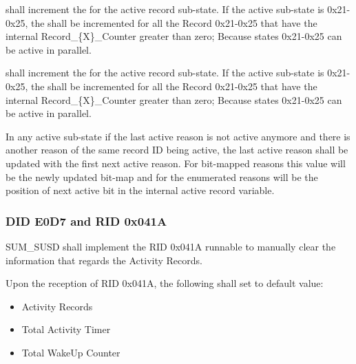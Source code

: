 { shall increment the  for the active record sub-state.
If the active sub-state is 0x21-0x25, the  shall be incremented for all the Record 0x21-0x25 that have the internal Record_\{X\}_Counter greater than zero; 
Because states 0x21-0x25 can be active in parallel.
}
{}

{ shall increment the  for the active record sub-state.
If the active sub-state is 0x21-0x25, the  shall be incremented for all the Record 0x21-0x25 that have the internal Record_\{X\}_Counter greater than zero; 
Because states 0x21-0x25 can be active in parallel.
}
{}

{In any active sub-state if the last active reason is not active anymore and there is another reason of the same record ID being active, the last active reason shall be updated with the first next active reason.
For bit-mapped reasons this value will be the newly updated bit-map and for the enumerated reasons will be the position of next active bit in the internal active record variable.
}
{}



\subsubsection{DID E0D7 and RID 0x041A}
\label{subsec:did_e0d7_rid_041a}
{SUM_SUSD shall implement the RID 0x041A runnable  to manually clear the information that regards the Activity Records.}
{ }

{Upon the reception of RID 0x041A, the following shall set to default value:
\begin{itemize}
	\item Activity Records
	\item Total Activity Timer
	\item Total WakeUp Counter
\end{itemize}
}
{}

